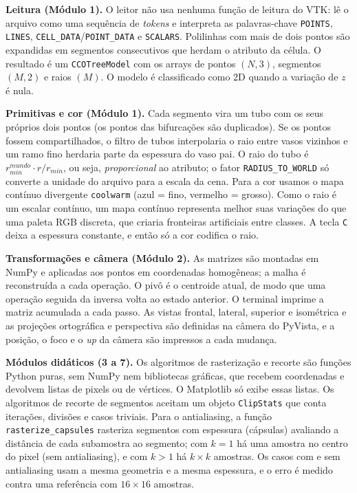 \documentclass[11pt, a4paper]{article}
\begin{document}
\textbf{Leitura (Módulo 1).} O leitor não usa nenhuma função de leitura do VTK: lê o arquivo como uma sequência de \emph{tokens} e interpreta as palavras-chave \texttt{POINTS}, \texttt{LINES}, \texttt{CELL\_DATA}/\texttt{POINT\_DATA} e \texttt{SCALARS}. Polilinhas com mais de dois pontos são expandidas em segmentos consecutivos que herdam o atributo da célula. O resultado é um \texttt{CCOTreeModel} com os arrays de pontos $(N,3)$, segmentos $(M,2)$ e raios $(M)$. O modelo é classificado como 2D quando a variação de $z$ é nula.

\textbf{Primitivas e cor (Módulo 1).} Cada segmento vira um tubo com os seus próprios dois pontos (os pontos das bifurcações são duplicados). Se os pontos fossem compartilhados, o filtro de tubos interpolaria o raio entre vasos vizinhos e um ramo fino herdaria parte da espessura do vaso pai. O raio do tubo é $r_{min}^{mundo}\cdot r/r_{min}$, ou seja, \emph{proporcional} ao atributo; o fator \texttt{RADIUS\_TO\_WORLD} só converte a unidade do arquivo para a escala da cena. Para a cor usamos o mapa contínuo divergente \texttt{coolwarm} (azul = fino, vermelho = grosso). Como o raio é um escalar contínuo, um mapa contínuo representa melhor suas variações do que uma paleta RGB discreta, que criaria fronteiras artificiais entre classes. A tecla \texttt{C} deixa a espessura constante, e então só a cor codifica o raio.

\textbf{Transformações e câmera (Módulo 2).} As matrizes são montadas em NumPy e aplicadas aos pontos em coordenadas homogêneas; a malha é reconstruída a cada operação. O pivô é o centroide atual, de modo que uma operação seguida da inversa volta ao estado anterior. O terminal imprime a matriz acumulada a cada passo. As vistas frontal, lateral, superior e isométrica e as projeções ortográfica e perspectiva são definidas na câmera do PyVista, e a posição, o foco e o \emph{up} da câmera são impressos a cada mudança.

\textbf{Módulos didáticos (3 a 7).} Os algoritmos de rasterização e recorte são funções Python puras, sem NumPy nem bibliotecas gráficas, que recebem coordenadas e devolvem listas de pixels ou de vértices. O Matplotlib só exibe essas listas. Os algoritmos de recorte de segmentos aceitam um objeto \texttt{ClipStats} que conta iterações, divisões e casos triviais. Para o antialiasing, a função \texttt{rasterize\_capsules} rasteriza segmentos com espessura (cápsulas) avaliando a distância de cada subamostra ao segmento; com $k=1$ há uma amostra no centro do pixel (sem antialiasing), e com $k>1$ há $k\times k$ amostras. Os casos com e sem antialiasing usam a mesma geometria e a mesma espessura, e o erro é medido contra uma referência com $16\times16$ amostras.
\end{document}
